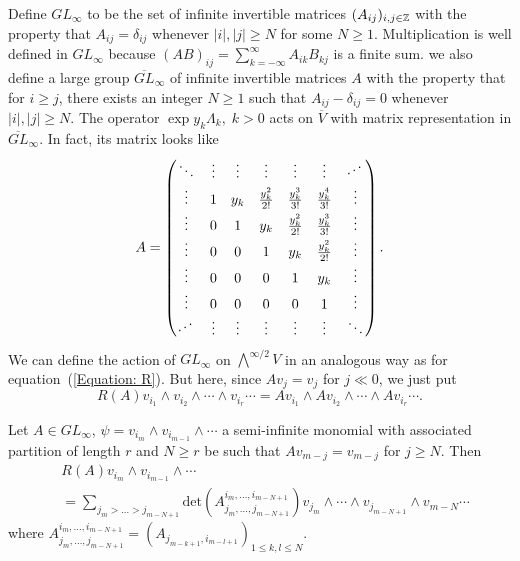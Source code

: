 Define $GL_\infty$ to be the set of infinite invertible matrices $(A_{ij})_{i,j\in\mathbb{Z}}$ with the property that $A_{ij}=\delta_{ij}$ whenever $|i|,|j|\geq N$ for some $N\geq1$. Multiplication is well defined in $GL_\infty$ because $(AB)_{ij}=\sum_{k=-\infty}^\infty A_{ik}B_{kj}$ is a finite sum. we also define a large group $\overline{GL}_\infty$ of infinite invertible matrices $A$ with the property that for $i\geq j$, 
there exists an integer $N\geq1$ such that $A_{ij}-\delta_{ij}=0$ whenever $|i|,|j|\geq N$. The operator $\exp y_k\Lambda_k,\; k>0$ acts on $\overline{V}$ with matrix representation in $\overline{GL}_\infty$. In fact, its matrix looks like
\begin{equation}\label{Equation: matrix representation of exp(yk_Lambdak)}
    A = \begin{pmatrix}
\ddots & \vdots & \vdots & \vdots & \vdots &\vdots & \rotatebox{30}{$\cdots$}  \\
\vdots&1 & y_k & \frac{y_k^2}{2!} & \frac{y_k^3}{3!} &  \frac{y_k^4}{3!}&\vdots \\
\vdots&0 & 1 & y_k & \frac{y_k^2}{2!} & \frac{y_k^3}{3!}&\vdots \\
\vdots& 0& 0 & 1 & y_k &\frac{y_k^2}{2!} &\vdots \\
\vdots& 0& 0 & 0 & 1 & y_k&\vdots \\
\vdots&0 & 0 & 0 & 0 & 1&\vdots \\
\rotatebox{30}{$\cdots$} & \vdots &\vdots &\vdots & \vdots & \vdots & \ddots \\
\end{pmatrix}.
\end{equation}
We can define the action of $GL_\infty$ on $\bigwedge^{\infty/2}V$ in an analogous way as for equation~(\ref{Equation: R}). But here, since $Av_{j}=v_j$ for $j\ll 0$, we just put
\begin{equation}
    R(A)v_{i_1}\wedge v_{i_2}\wedge\cdots\wedge v_{i_r}\cdots= Av_{i_1}\wedge Av_{i_2}\wedge\cdots\wedge Av_{i_r}\cdots.
\end{equation}
\begin{dang}
    \begin{theorem}\label{Theorem: R(A)psi = det A psi etc}
        Let $A\in GL_\infty$, $\psi=v_{i_m}\wedge v_{i_{m-1}}\wedge\cdots $ a semi-infinite monomial with associated partition of length $r$ and $N\geq r$  be such that $Av_{m-j}=v_{m-j}$ for $j\geq N$. Then
        \begin{equation}
        \begin{split}
            &R(A)v_{i_m}\wedge v_{i_{m-1}}\wedge \cdots\\ 
            &= \sum_{j_m>\dots>j_{m-N+1 }}\text{det}\left(A_{j_m,\dots, j_{m-N+1}}^{i_m,\dots, i_{m-N+1}}\right)v_{j_m}\wedge\cdots\wedge v_{j_{m-N+1}}\wedge v_{m-N}\cdots
        \end{split}
        \end{equation}
        where $A_{j_m,\dots ,j_{m-N+1}}^{i_m,\dots,i_{m-N+1}} = (A_{j_{m-k+1},i_{m-l+1}})_{1\leq k,l\leq N}$. 
    \end{theorem}
\end{dang}
